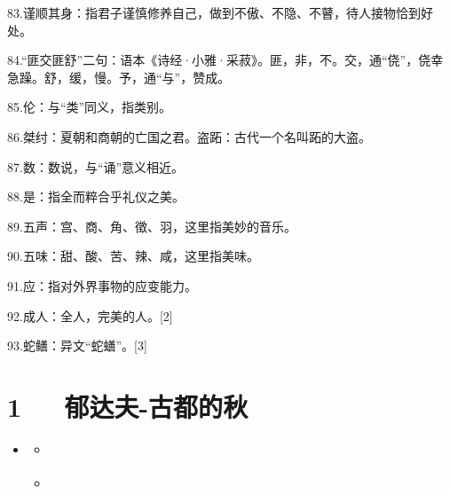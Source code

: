 \documentclass[letterpaper,10pt,english]{sphinxmanual}
\begin{document}
83.谨顺其身：指君子谨慎修养自己，做到不傲、不隐、不瞽，待人接物恰到好处。

84.“匪交匪舒”二句：语本《诗经·小雅·采菽》。匪，非，不。交，通“侥”，侥幸急躁。舒，缓，慢。予，通“与”，赞成。

85.伦：与“类”同义，指类别。

86.桀纣：夏朝和商朝的亡国之君。盗跖：古代一个名叫跖的大盗。

87.数：数说，与“诵”意义相近。

88.是：指全而粹合乎礼仪之美。

89.五声：宫、商、角、徵、羽，这里指美妙的音乐。

90.五味：甜、酸、苦、辣、咸，这里指美味。

91.应：指对外界事物的应变能力。

92.成人：全人，完美的人。{[}2{]}

93.蛇鳝：异文“蛇蟮”。{[}3{]}


\chapter{1   郁达夫-古都的秋}
\label{\detokenize{p01_u6563_u6587/_u90c1_u8fbe_u592b-_u53e4_u90fd_u7684_u79cb:id1}}\label{\detokenize{p01_u6563_u6587/_u90c1_u8fbe_u592b-_u53e4_u90fd_u7684_u79cb::doc}}
\begin{sphinxShadowBox}
\begin{itemize}
\item {} 
\label{\detokenize{p01_u6563_u6587/_u90c1_u8fbe_u592b-_u53e4_u90fd_u7684_u79cb:id5}}{\hyperref[\detokenize{p01_u6563_u6587/_u90c1_u8fbe_u592b-_u53e4_u90fd_u7684_u79cb:id1}]{}}
\begin{itemize}
\item {} 
\label{\detokenize{p01_u6563_u6587/_u90c1_u8fbe_u592b-_u53e4_u90fd_u7684_u79cb:id6}}{\hyperref[\detokenize{p01_u6563_u6587/_u90c1_u8fbe_u592b-_u53e4_u90fd_u7684_u79cb:id3}]{}}

\item {} 
\label{\detokenize{p01_u6563_u6587/_u90c1_u8fbe_u592b-_u53e4_u90fd_u7684_u79cb:id7}}{\hyperref[\detokenize{p01_u6563_u6587/_u90c1_u8fbe_u592b-_u53e4_u90fd_u7684_u79cb:id4}]{}}

\end{itemize}

\end{itemize}
\end{sphinxShadowBox}
\end{document}
